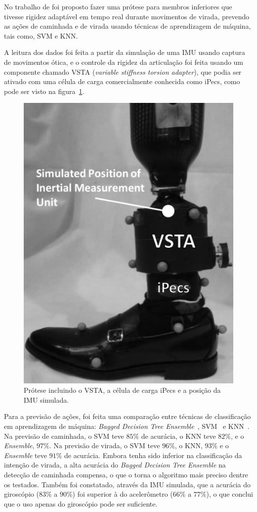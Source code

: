 No trabalho de  foi proposto fazer uma prótese para membros inferiores que tivesse rigidez adaptável em tempo real durante movimentos de virada, prevendo as ações de caminhada e de virada usando técnicas de aprendizagem de máquina, tais como, SVM e KNN\@.

A leitura dos dados foi feita a partir da simulação de uma IMU usando captura de movimentos ótica, e o controle da rigidez da articulação foi feita usando um componente chamado VSTA (\textit{variable stiffness torsion adapter}), que podia ser ativado com uma célula de carga comercialmente conhecida como iPecs, como pode ser visto na figura~\ref{fig:rel_turnintent_1}.

\begin{figure}[ht]
	\caption{\label{fig:rel_turnintent_1}Prótese incluindo o VSTA, a célula de carga iPecs e a posição da IMU simulada.}
	\begin{center}
	    \includegraphics[width=.4\textwidth]{resources/rel_pew_turnintent_1}
	\end{center}
\end{figure}

Para a previsão de ações, foi feita uma comparação entre técnicas de classificação em aprendizagem de máquina: \textit{Bagged Decision Tree Ensemble}~\cite{breiman:1996bagging}\cite{dietterich:2000ensemble}, SVM~\cite{cortes:1995svm} e KNN~\cite{cover:1967knn}\@. Na previsão de caminhada, o SVM teve $85\%$ de acurácia, o KNN teve $82\%$, e o \textit{Ensemble}, $97\%$. Na previsão de virada, o SVM teve $96\%$, o KNN, $93\%$ e o \textit{Ensemble} teve $91\%$ de acurácia. Embora tenha sido inferior na classificação da intenção de virada, a alta acurácia do \textit{Bagged Decision Tree Ensemble} na detecção de caminhada compensa, o que o torna o algoritmo mais preciso dentre os testados. Também foi constatado, através da IMU simulada, que a acurácia do giroscópio ($83\%$ a $90\%$) foi superior à do acelerômetro ($66\%$ a $77\%$), o que conclui que o uso apenas do giroscópio pode ser suficiente.

